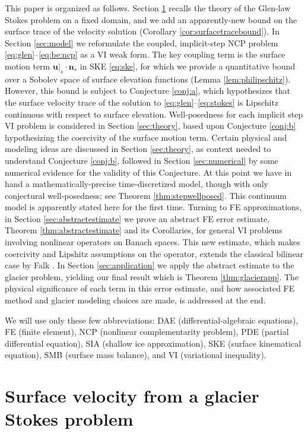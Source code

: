 \documentclass[hidelinks,onefignum,onetabnum,final]{siamart220329}  %
\newcommand{\bn}{\mathbf{n}}
\newcommand{\bu}{\mathbf{u}}
\begin{document}
This paper is organized as follows.  Section \ref{sec:stokes} recalls the theory of the Glen-law Stokes problem on a fixed domain, and we add an apparently-new bound on the surface trace of the velocity solution (Corollary \ref{cor:surfacetracebound}).  In Section \ref{sec:model} we reformulate the coupled, implicit-step NCP problem \eqref{eq:glen}--\eqref{eq:be:ncp} as a VI weak form.  The key coupling term is the surface motion term $\bu|_s\cdot \bn_s$ in SKE \eqref{eq:ske}, for which we provide a quantitative bound over a Sobolev space of surface elevation functions (Lemma \ref{lem:philipschitz}).  However, this bound is subject to Conjecture \ref{conj:a}, which hypothesizes that the surface velocity trace of the solution to \eqref{eq:glen}--\eqref{eq:stokes} is Lipschitz continuous with respect to surface elevation.  Well-posedness for each implicit step VI problem is considered in Section \ref{sec:theory}, based upon Conjecture \ref{conj:b} hypothesizing the coercivity of the surface motion term.  Certain physical and modeling ideas are discussed in Section \ref{sec:theory}, as context needed to understand Conjecture \ref{conj:b}, followed in Section \ref{sec:numerical} by some numerical evidence for the validity of this Conjecture.  At this point we have in hand a mathematically-precise time-discretized model, though with only conjectural well-posedness; see Theorem \ref{thm:stepwellposed}.  This continuum model is apparently stated here for the first time.  Turning to FE approximations, in Section \ref{sec:abstractestimate} we prove an abstract FE error estimate, Theorem \ref{thm:abstractestimate} and its Corollaries, for general VI problems involving nonlinear operators on Banach spaces.  This new estimate, which makes coercivity and Lipshitz assumptions on the operator, extends the classical bilinear case by Falk \cite{Falk1974}.  In Section \ref{sec:application} we apply the abstract estimate to the glacier problem, yielding our final result which is Theorem \ref{thm:glacierapp}.  The physical significance of each term in this error estimate, and how associated FE method and glacier modeling choices are made, is addressed at the end.

We will use only these few abbreviations: DAE (differential-algebraic equations), FE (finite element), NCP (nonlinear complementarity problem), PDE (partial differential equation), SIA (shallow ice approximation), SKE (surface kinematical equation), SMB (surface mass balance), and VI (variational inequality).


\section{Surface velocity from a glacier Stokes problem} \label{sec:stokes}
\end{document}
